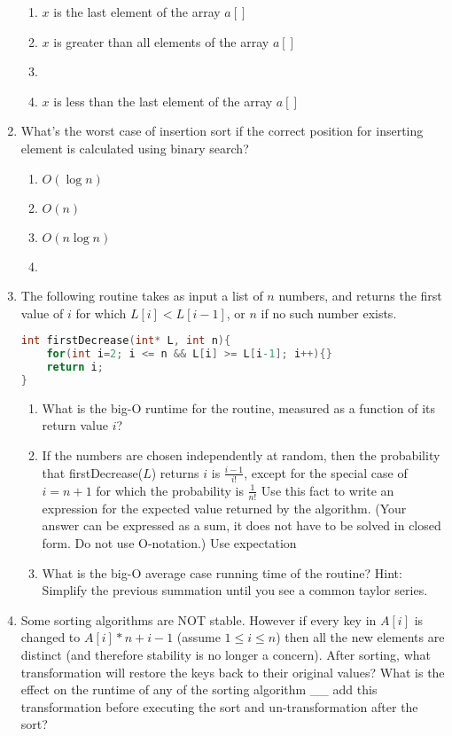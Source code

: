 \documentclass[12pt]{report}
\begin{document}
\begin{enumerate}[label=\arabic*.]
\begin{enumerate}[label=\alph*)]
    \item $x$ is the last element of the array $a[]$
    \item $x$ is greater than all elements of the array $a[]$
	\item {}
	\item $x$ is less than the last element of the array $a[]$
\end{enumerate}
	\item What's the worst case of insertion sort if the correct position for inserting element is calculated using binary search?
	\begin{enumerate}[label=\alph*)]
	    \item $O\left( \log n \right)$
	    \item $O\left( n \right)$
	    \item $O\left( n\log n \right)$
	    \item {}
	\end{enumerate}
	\item The following routine takes as input a list of $n$ numbers, and returns the first value of $i$ for which $L[i] < L[i-1]$, or $n$ if no such number exists.
\begin{lstlisting}[language=C,label={lst:first-decrease}]
int firstDecrease(int* L, int n){
	for(int i=2; i <= n && L[i] >= L[i-1]; i++){}
	return i;
}
\end{lstlisting}
	\begin{enumerate}[label=\arabic{enumi}\alph*)]
	    \item What is the big-O runtime for the routine, measured as a function of its return value $i$?
		\item If the numbers are chosen independently at random, then the probability that firstDecrease($L$) returns $i$ is $\frac{i-1}{i!}$, except for the special case of $i=n+1$ for which the probability is $\frac{1}{n!}$ Use this fact to write an expression for the expected value returned by the algorithm. (Your answer can be expressed as a sum, it does not have to be solved in closed form. Do not use O-notation.) Use expectation
		\item What is the big-O average case running time of the routine? Hint: Simplify the previous summation until you see a common taylor series.
	\end{enumerate}
	\item Some sorting algorithms are NOT stable. However if every key in $A[i]$ is changed to $A[i]*n+i-1$ (assume $1 \leq i \leq n$) then all the new elements are distinct (and therefore stability is no longer a concern). After sorting, what transformation will restore the keys back to their original values? What is the effect on the runtime of any of the sorting algorithm \_\_ add this transformation before executing the sort and un-transformation after the sort?\answer{\begin{equation*}

\end{equation*}}
\end{enumerate}
\end{document}
